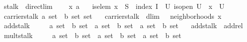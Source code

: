 \documentclass[12pt]{scrartcl}
\begin{document}
\begin{isabelle}
\isamarkupfalse%
\ stalk\ {\isacharequal}{\kern0pt}\ direct{\isacharunderscore}{\kern0pt}lim\ {\isacharplus}{\kern0pt}\isanewline
\ \ \ x{\isacharcolon}{\kern0pt}{\isacharcolon}{\kern0pt}\ {\isachardoublequoteopen}{\isacharprime}{\kern0pt}a{\isachardoublequoteclose}\isanewline
\ \ \ is{\isacharunderscore}{\kern0pt}elem{\isacharcolon}{\kern0pt}\ {\isachardoublequoteopen}x\ {\isasymin}\ S{\isachardoublequoteclose}\ \ index{\isacharcolon}{\kern0pt}\ {\isachardoublequoteopen}I\ {\isacharequal}{\kern0pt}\ {\isacharbraceleft}{\kern0pt}U{\isachardot}{\kern0pt}\ is{\isacharunderscore}{\kern0pt}open\ U\ {\isasymand}\ x\ {\isasymin}\ U{\isacharbraceright}{\kern0pt}{\isachardoublequoteclose}\isanewline
{}\isanewline
\isanewline
{}\isamarkupfalse%
\ carrier{\isacharunderscore}{\kern0pt}stalk{\isacharcolon}{\kern0pt}{\isacharcolon}{\kern0pt}\ {\isachardoublequoteopen}{\isacharparenleft}{\kern0pt}{\isacharprime}{\kern0pt}a\ set\ {\isasymtimes}\ {\isacharprime}{\kern0pt}b{\isacharparenright}{\kern0pt}\ set\ set{\isachardoublequoteclose}\isanewline
\ \ \ {\isachardoublequoteopen}carrier{\isacharunderscore}{\kern0pt}stalk\ {\isasymequiv}\ dlim\ {\isasymFF}\ {\isasymrho}\ {\isacharparenleft}{\kern0pt}neighborhoods\ x{\isacharparenright}{\kern0pt}{\isachardoublequoteclose}\isanewline
\isanewline
{}\isamarkupfalse%
\ add{\isacharunderscore}{\kern0pt}stalk\isanewline
\ \ \ \ {\isacharcolon}{\kern0pt}{\isacharcolon}{\kern0pt}\ {\isachardoublequoteopen}{\isacharparenleft}{\kern0pt}{\isacharprime}{\kern0pt}a\ set\ {\isasymtimes}\ {\isacharprime}{\kern0pt}b{\isacharparenright}{\kern0pt}\ set\ {\isasymRightarrow}\ {\isacharparenleft}{\kern0pt}{\isacharprime}{\kern0pt}a\ set\ {\isasymtimes}\ {\isacharprime}{\kern0pt}b{\isacharparenright}{\kern0pt}\ set\ {\isasymRightarrow}\ {\isacharparenleft}{\kern0pt}{\isacharprime}{\kern0pt}a\ set\ {\isasymtimes}\ {\isacharprime}{\kern0pt}b{\isacharparenright}{\kern0pt}\ set{\isachardoublequoteclose}\isanewline
\ \ \ {\isachardoublequoteopen}add{\isacharunderscore}{\kern0pt}stalk\ {\isasymequiv}\ add{\isacharunderscore}{\kern0pt}rel{\isachardoublequoteclose}\isanewline
\isanewline
{}\isamarkupfalse%
\ mult{\isacharunderscore}{\kern0pt}stalk\isanewline
\ \ \ \ {\isacharcolon}{\kern0pt}{\isacharcolon}{\kern0pt}\ {\isachardoublequoteopen}{\isacharparenleft}{\kern0pt}{\isacharprime}{\kern0pt}a\ set\ {\isasymtimes}\ {\isacharprime}{\kern0pt}b{\isacharparenright}{\kern0pt}\ set\ {\isasymRightarrow}\ {\isacharparenleft}{\kern0pt}{\isacharprime}{\kern0pt}a\ set\ {\isasymtimes}\ {\isacharprime}{\kern0pt}b{\isacharparenright}{\kern0pt}\ set\ {\isasymRightarrow}\ {\isacharparenleft}{\kern0pt}{\isacharprime}{\kern0pt}a\ set\ {\isasymtimes}\ {\isacharprime}{\kern0pt}b{\isacharparenright}{\kern0pt}\ set{\isachardoublequoteclose}\isanewline

\end{isabelle}
\end{document}

